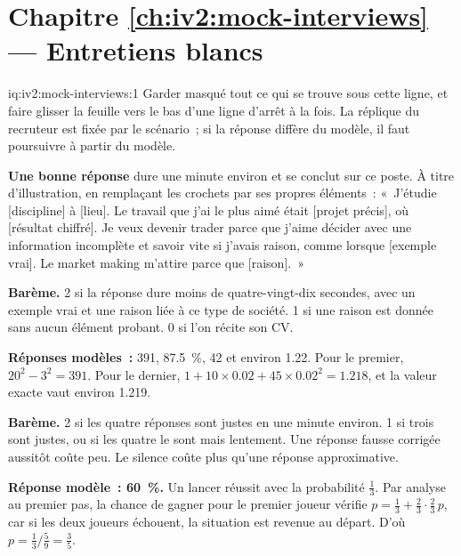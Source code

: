 \section*{Chapitre \ref{ch:iv2:mock-interviews} --- Entretiens blancs}

\begin{solution}{iq:iv2:mock-interviews:1}
Garder masqué tout ce qui se trouve sous cette ligne, et faire glisser la feuille vers le bas d'une ligne d'arrêt à la fois. La réplique du recruteur est fixée par le scénario~; si la réponse diffère du modèle, il faut poursuivre à partir du modèle.

\ivstop
\textbf{Une bonne réponse} dure une minute environ et se conclut sur ce poste. À titre d'illustration, en remplaçant les crochets par ses propres éléments~: «~J'étudie [discipline] à [lieu]. Le travail que j'ai le plus aimé était [projet précis], où [résultat chiffré]. Je veux devenir trader parce que j'aime décider avec une information incomplète et savoir vite si j'avais raison, comme lorsque [exemple vrai]. Le market making m'attire parce que [raison].~»

\textbf{Barème.} 2 si la réponse dure moins de quatre-vingt-dix secondes, avec un exemple vrai et une raison liée à ce type de société. 1 si une raison est donnée sans aucun élément probant. 0 si l'on récite son CV.

\ivstop
\textbf{Réponses modèles~:} 391, 87.5~\%, 42 et environ 1.22. Pour le premier, $20^2 - 3^2 = 391$. Pour le dernier, $1 + 10 \times 0.02 + 45 \times 0.02^2 = 1.218$, et la valeur exacte vaut environ 1.219.

\textbf{Barème.} 2 si les quatre réponses sont justes en une minute environ. 1 si trois sont justes, ou si les quatre le sont mais lentement. Une réponse fausse corrigée aussitôt coûte peu. Le silence coûte plus qu'une réponse approximative.

\ivstop
\textbf{Réponse modèle~: 60~\%.} Un lancer réussit avec la probabilité $\tfrac13$. Par analyse au premier pas, la chance de gagner pour le premier joueur vérifie $p = \tfrac13 + \tfrac23 \cdot \tfrac23\, p$, car si les deux joueurs échouent, la situation est revenue au départ. D'où $p = \tfrac13 \big/ \tfrac59 = \tfrac35$.


\end{solution}
